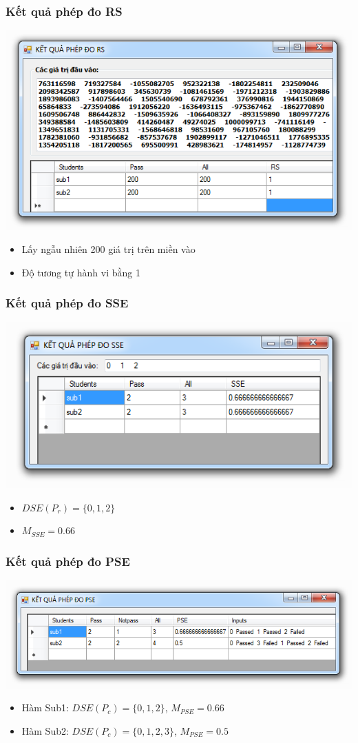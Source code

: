 \documentclass{beamer}
\begin{document}
\begin{frame}
\frametitle{Kết quả phép đo RS}
\centering \includegraphics[width=0.8\linewidth]{images/kq_rs.png}
\begin{itemize}
	\item Lấy ngẫu nhiên 200 giá trị trên miền vào
	\item Độ tương tự hành vi bằng 1
\end{itemize}
\end{frame}

\begin{frame}
\frametitle{Kết quả phép đo SSE}
\includegraphics[width=0.8\linewidth]{images/kq_sse.png} 
\begin{itemize}
	\item $ DSE(P_r) = \{0, 1, 2\} $
	\item $ M_{SSE}= 0.66 $
\end{itemize}
\end{frame}

\begin{frame}
\frametitle{Kết quả phép đo PSE}
\includegraphics[width=1.0\linewidth]{images/kq_pse.png}
\begin{itemize}
	\item Hàm Sub1: $ DSE(P_{c}) = \{0, 1, 2\} $, $ M_{PSE}= 0.66 $
	\item Hàm Sub2: $ DSE(P_{c}) = \{0, 1, 2, 3\} $, $ M_{PSE}= 0.5 $
\end{itemize}
\end{frame}
\end{document}
